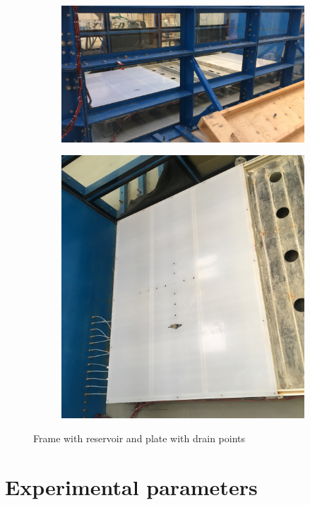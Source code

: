 \begin{figure}[ht!]
\centering
\begin{subfigure}{.66\textwidth}
  \centering
  \includegraphics[width=.9\linewidth]{Images/Bottom_frame_test.png}
  \label{subfig:bottom_frame}
\end{subfigure}%
\begin{subfigure}{.34\textwidth}
  \centering
  \includegraphics[width=.9\linewidth]{Images/Plate_test.png}
  \label{subfig:plate_test}
\end{subfigure}
\caption{Frame with reservoir and plate with drain points}
\label{fig:frame}
\end{figure}


\section{Experimental parameters}
\label{sec:para}
 


